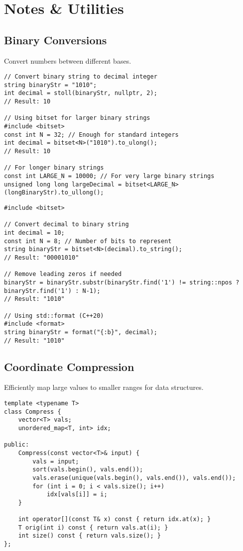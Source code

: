 \documentclass[11pt,a4paper]{article}
\begin{document}
\newpage
\section{Notes \& Utilities}

\subsection{Binary Conversions}
Convert numbers between different bases.

\begin{lstlisting}[caption={Binary to Decimal Conversion}]
// Convert binary string to decimal integer
string binaryStr = "1010";
int decimal = stoll(binaryStr, nullptr, 2);
// Result: 10

// Using bitset for larger binary strings
#include <bitset>
const int N = 32; // Enough for standard integers
int decimal = bitset<N>("1010").to_ulong();
// Result: 10

// For longer binary strings
const int LARGE_N = 10000; // For very large binary strings
unsigned long long largeDecimal = bitset<LARGE_N>(longBinaryStr).to_ullong();
\end{lstlisting}


\begin{lstlisting}[caption={Decimal to Binary Conversion}]
#include <bitset>

// Convert decimal to binary string
int decimal = 10;
const int N = 8; // Number of bits to represent
string binaryStr = bitset<N>(decimal).to_string();
// Result: "00001010"

// Remove leading zeros if needed
binaryStr = binaryStr.substr(binaryStr.find('1') != string::npos ? binaryStr.find('1') : N-1);
// Result: "1010"

// Using std::format (C++20)
#include <format>
string binaryStr = format("{:b}", decimal);
// Result: "1010"
\end{lstlisting}



\newpage

\subsection{Coordinate Compression}
Efficiently map large values to smaller ranges for data structures.

\begin{lstlisting}[caption={Coordinate Compression Template}]
template <typename T>
class Compress {
    vector<T> vals;
    unordered_map<T, int> idx;

public:
    Compress(const vector<T>& input) {
        vals = input;
        sort(vals.begin(), vals.end());
        vals.erase(unique(vals.begin(), vals.end()), vals.end());
        for (int i = 0; i < vals.size(); i++)
            idx[vals[i]] = i;
    }

    int operator[](const T& x) const { return idx.at(x); }
    T orig(int i) const { return vals.at(i); }
    int size() const { return vals.size(); }
};
\end{lstlisting}
\end{document}
